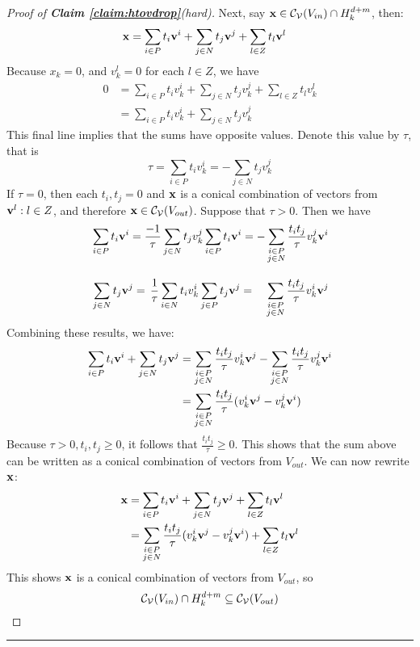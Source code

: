 \documentclass[a4,fleqn]{article}
\begin{document}
\begin{proof}[Proof of \textnormal{\textbf{Claim \ref{claim:htovdrop}}}(hard)]
Next, say $\mathbf{x} \in \mathcal{C}_{\mathcal{V}}(V_{in}) \cap H^{d+m}_k$, then:
\begin{align*}
\mathbf{x} &= \sum_{i \in P}t_i\mathbf{v}^i + \sum_{j \in N} t_j\mathbf{v}^j + \sum_{l \in Z} t_l\mathbf{v}^l
\end{align*}
Because $x_k = 0$, and $v^l_k = 0$ for each $l \in Z$, we have
\begin{align*}
 0 &= \sum_{i \in P}t_i v^i_k + \sum_{j \in N} t_j v^j_k + \sum_{l \in Z} t_l v^l_k \\
   &= \sum_{i \in P}t_i v^i_k + \sum_{j \in N} t_j v^j_k
\end{align*}
This final line implies that the sums have opposite values.  Denote this value by $\tau$, that is
\[ \tau = \sum_{i \in P}t_i v^i_k = -\sum_{j \in N} t_j v^j_k \]
If $\tau = 0$, then each $t_i,t_j = 0$ and $\mathbf{x}$ is a conical combination of vectors from $\mathbf{v}^l : l \in Z$, and therefore $\mathbf{x} \in \mathcal{C}_{\mathcal{V}}(V_{out})$.  Suppose that $\tau > 0$.  Then we have
\begin{align*} 
 &\sum_{i \in P}t_i \mathbf{v}^i 
   = \frac{-1}{\tau}\sum_{j \in N}t_j v^j_k \sum_{i \in P}t_i \mathbf{v}^i 
   = -\sum_{\substack{ i \in P \\ j \in N }} \frac{t_i t_j}{\tau} v^j_k \mathbf{v}^i \\[1em]
 &\sum_{j \in N}t_j \mathbf{v}^j 
   = \,\frac{1}{\tau}\sum_{i \in N}t_i v^i_k \sum_{j \in P}t_j \mathbf{v}^j 
   = \quad\sum_{\substack{ i \in P \\ j \in N }} \frac{t_i t_j}{\tau} v^i_k \mathbf{v}^j
\end{align*}
Combining these results, we have:
\begin{align*}
   \sum_{i \in P}t_i \mathbf{v}^i + \sum_{j \in N}t_j \mathbf{v}^j 
   &= \sum_{\substack{ i \in P \\ j \in N }} \frac{t_i t_j}{\tau} v^i_k \mathbf{v}^j 
      - \sum_{\substack{ i \in P \\ j \in N }} \frac{t_i t_j}{\tau} v^j_k \mathbf{v}^i \\
   &=  \sum_{\substack{ i \in P \\ j \in N }} \frac{t_i t_j}{\tau}(v^i_k\mathbf{v}^j - v^j_k\mathbf{v}^i)
\end{align*}
Because $\tau > 0, t_i,t_j \geq 0$, it follows that $\frac{t_i t_j}{\tau} \geq 0$.  This shows that the sum above can be written as a conical combination of vectors from $V_{out}$.  We can now rewrite $\mathbf{x}$:
\begin{align*}
\mathbf{x} &= \sum_{i\in P}t_i\mathbf{v}^i + \sum_{j\in N} t_j\mathbf{v}^j + \sum_{l\in Z} t_l\mathbf{v}^l \\
   &=  \sum_{\substack{ i \in P \\ j \in N }} \frac{t_i t_j}{\tau}(v^i_k\mathbf{v}^j - v^j_k\mathbf{v}^i) +
        \sum_{l \in Z} t_l \mathbf{v}^l
\end{align*}
This shows $\mathbf{x}$ is a conical combination of vectors from $V_{out}$, so 
\[ \mathcal{C}_{\mathcal{V}}(V_{in}) \cap H^{d+m}_k \subseteq \mathcal{C}_{\mathcal{V}}(V_{out}) \]
\end{proof}

\bigskip \hrule \bigskip
\end{document}
